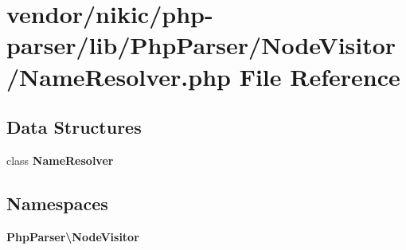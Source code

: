\section{vendor/nikic/php-\/parser/lib/\+Php\+Parser/\+Node\+Visitor/\+Name\+Resolver.php File Reference}
\label{_name_resolver_8php}
\subsection*{Data Structures}
\begin{DoxyCompactItemize}
\item 
class {\bf Name\+Resolver}
\end{DoxyCompactItemize}
\subsection*{Namespaces}
\begin{DoxyCompactItemize}
\item 
 {\bf Php\+Parser\textbackslash{}\+Node\+Visitor}
\end{DoxyCompactItemize}
